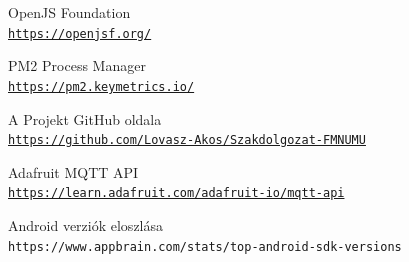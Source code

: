 \documentclass[
]{thesis-ekf}
\theoremstyle{definition}
\theoremstyle{remark}
\begin{document}
\begin{thebibliography}{2}
OpenJS Foundation
\\\texttt{\url{https://openjsf.org/}}

PM2 Process Manager
\\\texttt{\url{https://pm2.keymetrics.io/}}

A Projekt GitHub oldala
\\\texttt{\url{https://github.com/Lovasz-Akos/Szakdolgozat-FMNUMU}}

Adafruit MQTT API
\\\texttt{\url{https://learn.adafruit.com/adafruit-io/mqtt-api}}

Android verziók eloszlása
\\\texttt{https://www.appbrain.com/stats/top-android-sdk-versions}
\end{thebibliography}
%
\end{document}
